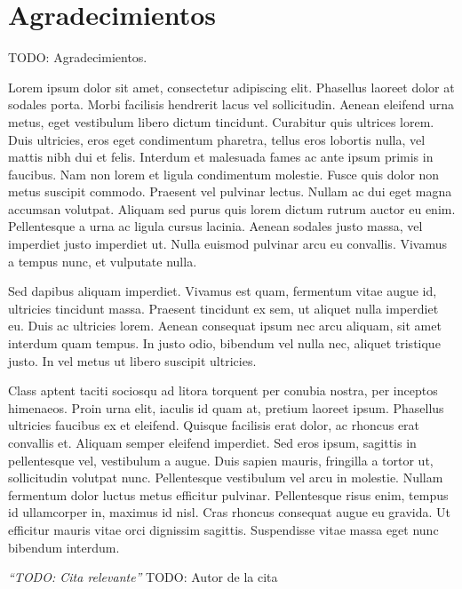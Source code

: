 \chapter*{Agradecimientos}

TODO: Agradecimientos.

Lorem ipsum dolor sit amet, consectetur adipiscing elit. Phasellus laoreet dolor at sodales porta. Morbi facilisis hendrerit lacus vel sollicitudin. Aenean eleifend urna metus, eget vestibulum libero dictum tincidunt. Curabitur quis ultrices lorem. Duis ultricies, eros eget condimentum pharetra, tellus eros lobortis nulla, vel mattis nibh dui et felis. Interdum et malesuada fames ac ante ipsum primis in faucibus. Nam non lorem et ligula condimentum molestie. Fusce quis dolor non metus suscipit commodo. Praesent vel pulvinar lectus. Nullam ac dui eget magna accumsan volutpat. Aliquam sed purus quis lorem dictum rutrum auctor eu enim. Pellentesque a urna ac ligula cursus lacinia. Aenean sodales justo massa, vel imperdiet justo imperdiet ut. Nulla euismod pulvinar arcu eu convallis. Vivamus a tempus nunc, et vulputate nulla.

Sed dapibus aliquam imperdiet. Vivamus est quam, fermentum vitae augue id, ultricies tincidunt massa. Praesent tincidunt ex sem, ut aliquet nulla imperdiet eu. Duis ac ultricies lorem. Aenean consequat ipsum nec arcu aliquam, sit amet interdum quam tempus. In justo odio, bibendum vel nulla nec, aliquet tristique justo. In vel metus ut libero suscipit ultricies.

Class aptent taciti sociosqu ad litora torquent per conubia nostra, per inceptos himenaeos. Proin urna elit, iaculis id quam at, pretium laoreet ipsum. Phasellus ultricies faucibus ex et eleifend. Quisque facilisis erat dolor, ac rhoncus erat convallis et. Aliquam semper eleifend imperdiet. Sed eros ipsum, sagittis in pellentesque vel, vestibulum a augue. Duis sapien mauris, fringilla a tortor ut, sollicitudin volutpat nunc. Pellentesque vestibulum vel arcu in molestie. Nullam fermentum dolor luctus metus efficitur pulvinar. Pellentesque risus enim, tempus id ullamcorper in, maximus id nisl. Cras rhoncus consequat augue eu gravida. Ut efficitur mauris vitae orci dignissim sagittis. Suspendisse vitae massa eget nunc bibendum interdum.


\begin{flushright}
\textit{``TODO: Cita relevante''}
TODO: Autor de la cita
\end{flushright}
